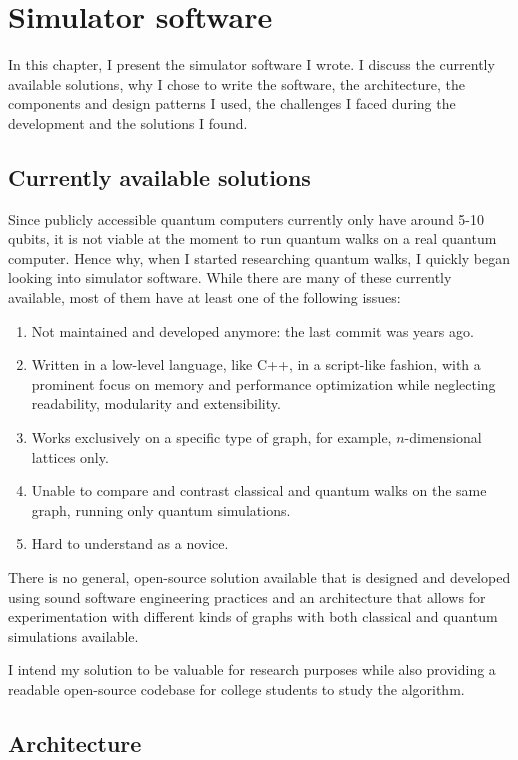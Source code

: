 \chapter{Simulator software}

In this chapter, I present the simulator software I wrote. I discuss the currently available solutions, why I chose to write the software, the architecture, the components and design patterns I used, the challenges I faced during the development and the solutions I found.

\section{Currently available solutions}

Since publicly accessible quantum computers currently only have around 5-10 qubits, it is not viable at the moment to run quantum walks on a real quantum computer. Hence why, when I started researching quantum walks, I quickly began looking into simulator software. While there are many of these currently available, most of them have at least one of the following issues:

\begin{enumerate}
\item Not maintained and developed anymore: the last commit was years ago.
\item Written in a low-level language, like C++, in a script-like fashion, with a prominent focus on memory and performance optimization while neglecting readability, modularity and extensibility.
\item Works exclusively on a specific type of graph, for example, $n$-dimensional lattices only.
\item Unable to compare and contrast classical and quantum walks on the same graph, running only quantum simulations.
\item Hard to understand as a novice.
\end{enumerate}

There is no general, open-source solution available that is designed and developed using sound software engineering practices and an architecture that allows for experimentation with different kinds of graphs with both classical and quantum simulations available.

I intend my solution to be valuable for research purposes while also providing a readable open-source codebase for college students to study the algorithm.

\section{Architecture}

